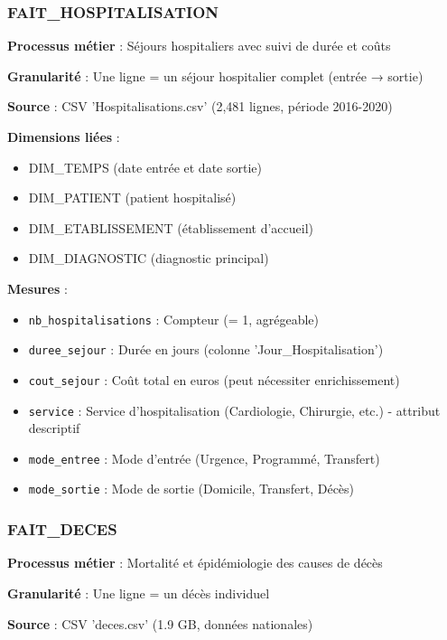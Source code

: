 \subsubsection{FAIT_HOSPITALISATION}

\textbf{Processus métier} : Séjours hospitaliers avec suivi de durée et coûts

\textbf{Granularité} : Une ligne = un séjour hospitalier complet (entrée → sortie)

\textbf{Source} : CSV 'Hospitalisations.csv' (2,481 lignes, période 2016-2020)

\textbf{Dimensions liées} :
\begin{itemize}[leftmargin=*]
    \item DIM_TEMPS (date entrée et date sortie)
    \item DIM_PATIENT (patient hospitalisé)
    \item DIM_ETABLISSEMENT (établissement d'accueil)
    \item DIM_DIAGNOSTIC (diagnostic principal)
\end{itemize}

\textbf{Mesures} :
\begin{itemize}[leftmargin=*]
    \item \texttt{nb_hospitalisations} : Compteur (= 1, agrégeable)
    \item \texttt{duree_sejour} : Durée en jours (colonne 'Jour_Hospitalisation')
    \item \texttt{cout_sejour} : Coût total en euros (peut nécessiter enrichissement)
    \item \texttt{service} : Service d'hospitalisation (Cardiologie, Chirurgie, etc.) - attribut descriptif
    \item \texttt{mode_entree} : Mode d'entrée (Urgence, Programmé, Transfert)
    \item \texttt{mode_sortie} : Mode de sortie (Domicile, Transfert, Décès)
\end{itemize}

\subsubsection{FAIT_DECES}

\textbf{Processus métier} : Mortalité et épidémiologie des causes de décès

\textbf{Granularité} : Une ligne = un décès individuel

\textbf{Source} : CSV 'deces.csv' (1.9 GB, données nationales)

